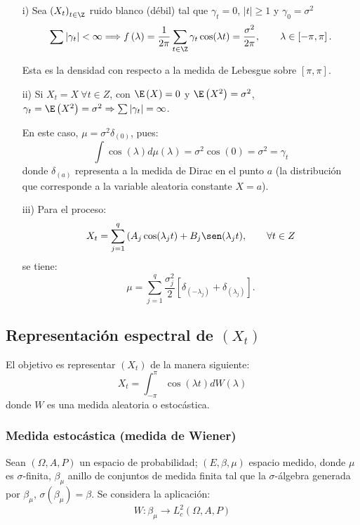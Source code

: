 \begin{ejemplo}
 \begin{enumerate}
\item[i)] Sea $\left( X_{t} \right)_{t\in \Z}$ ruido blanco (d\'{e}bil) tal que $\gamma_{t}=0$, $\left| t \right|\geq 1$ y $\gamma_{0}=\sigma^{2}$
\[
\sum \left| \gamma_{t} \right| <\infty \Longrightarrow f\left( \lambda \right)=
\frac{1}{2\pi }\sum_{t\in \Z} {\gamma_{t}\cos(\lambda t)} 
=\frac{\sigma^{2}}{2\pi },\qquad \lambda \in \left[ -\pi ,\pi \right].
\]

Esta es la densidad con respecto a la medida de Lebesgue sobre $\left[ \pi ,\pi \right]$.

\item[ii)] Si $X_{t}=X\ \forall t\in Z$, con $\E\left( X \right)=0$ y $\E\left( X^{2} \right)=\sigma^{2}$, $\gamma_{t}=\E\left( X^{2} \right)=\sigma^{2}\Rightarrow \sum \left| \gamma_{t} \right| =\infty $. 

En este caso, $\mu =\sigma^{2}\delta_{(0)}$, pues: 
\[
\int {\cos(\lambda )d\mu (\lambda )} =\sigma^{2}\cos \left( 0 \right)=\sigma 
^{2}=\gamma_{t}
\]
donde $\delta_{(a)}$ representa a la medida de Dirac en el punto $a$ (la distribuci\'{o}n que corresponde a la variable aleatoria constante $X=a$).

\item[iii)] Para el proceso:
\[
X_{t}=\sum_{j=1}^q {\left(A_{j}\cos ( \lambda_{j}t ) + B_{j}\sen(\lambda_{j}t\right)} ,\qquad \forall t\in Z
\]
se tiene:
\[
\mu =\sum_{j=1}^q {\frac{\sigma_{j}^{2}}{2}\left[ \delta_{(-\lambda_{j})}+\delta_{(\lambda_{j})} \right]}. 
\]
\end{enumerate}
\end{ejemplo}


\subsection{Representaci\'{o}n espectral de $(X_{t})$ }
El objetivo es representar $(X_{t})$ de la manera siguiente:
\[
X_{t}=\int_{-\pi }^\pi {\cos(\lambda t)dW(\lambda )} 
\]
donde $W$ es una medida aleatoria o estoc\'{a}stica.

\subsubsection{Medida estoc\'{a}stica (medida de Wiener)}

Sean $\left(\Omega,A,P \right)$ un espacio de probabilidad; $(E,\beta, \mu )$ espacio medido, donde $\mu $ es $\sigma 
$-finita, $\beta_{\mu }$ anillo de conjuntos de medida finita tal que la $\sigma $-\'{a}lgebra generada por $\beta_{\mu }$, $\sigma \left( \beta_{\mu } \right)=\beta $. Se considera la aplicaci\'{o}n:
\[
W:\beta_{\mu }\to L_{c}^{2}\left( \Omega, A, P \right)
\]


